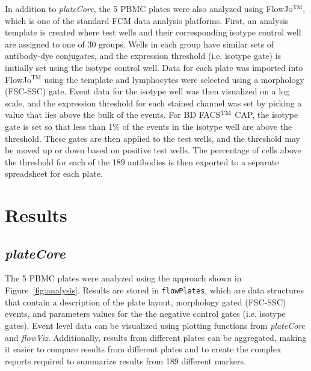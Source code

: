 \documentclass[12pt]{article}
\newcommand{\Robject}[1]{{\texttt{#1}}}
\newcommand{\Rpackage}[1]{{\textit{#1}}}
\def\tm{$^{\rm \text{TM }}$}
\begin{document}
In addition to \Rpackage{plateCore}, the 5 PBMC plates were also analyzed using FlowJo$^{\text{TM}}$,
which is one of the standard FCM data analysis platforms. First, an analysis template is created
where test wells and their corresponding isotype control well are assigned to one of 30 groups. Wells in each
group have similar sets of antibody-dye conjugates, and the expression threshold (i.e. isotype gate)
is initially set using the isotype control well. Data for each plate was imported into FlowJo$^{\text{TM}}$
using the template and
lymphocytes were selected using a morphology (FSC-SSC) gate. Event data for the isotype well was then
visualized on a log scale, and the expression threshold for each stained channel was set by picking a
value that lies above the bulk of the events. For BD FACS\tm CAP, the isotype gate is set so that less than
1\% of the events in the isotype well are above the threshold. These gates are then applied to the test
wells, and the threshold may be moved up or down based on positive test wells. The percentage
of cells above the threshold for each of the 189 antibodies is then exported to a separate spreadsheet for 
each plate.

\section*{Results}

\subsection*{\Rpackage{plateCore}}
The 5 PBMC plates were analyzed using the approach shown in Figure~\ref{fig:analysis}.  Results
are stored in \Robject{flowPlates}, which are data structures that contain a description of the
plate layout, morphology gated (FSC-SSC) events, and parameters values for the 
the negative control gates (i.e. isotype gates). Event level data can be 
visualized using plotting functions from \Rpackage{plateCore} and \Rpackage{flowViz}. 
Additionally, results from different plates can be aggregated, making it easier to compare
results from different plates and to create the complex reports required to summarize results from 
189 different markers.
\end{document}
